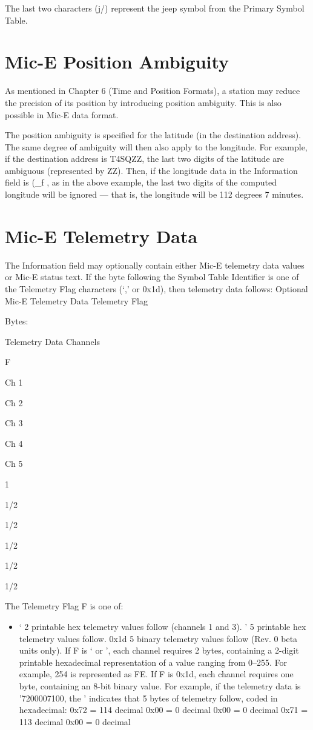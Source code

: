The last two characters (j/) represent the jeep symbol from the Primary
Symbol Table.



\section {Mic-E Position Ambiguity}

As mentioned in Chapter 6 (Time and Position Formats), a station may
reduce the precision of its position by introducing position ambiguity. This is
also possible in Mic-E data format.

The position ambiguity is specified for the latitude (in the destination
address). The same degree of ambiguity will then also apply to the longitude.
For example, if the destination address is T4SQZZ, the last two digits of the
latitude are ambiguous (represented by ZZ). Then, if the longitude data in the
Information field is (_f , as in the above example, the last two digits of the
computed longitude will be ignored — that is, the longitude will be 112
degrees 7 minutes.

\section {Mic-E Telemetry Data}

The Information field may optionally contain either Mic-E telemetry data
values or Mic-E status text.
If the byte following the Symbol Table Identifier is one of the Telemetry
Flag characters (‘,' or 0x1d), then telemetry data follows:
Optional Mic-E Telemetry Data
Telemetry
Flag

Bytes:

Telemetry Data Channels

F

Ch 1

Ch 2

Ch 3

Ch 4

Ch 5

1

1/2

1/2

1/2

1/2

1/2


The Telemetry Flag F is one of:

\begin{itemize}
  
\item ‘
2 printable hex telemetry values follow (channels 1 and 3).
'
5 printable hex telemetry values follow.
0x1d 5 binary telemetry values follow (Rev. 0 beta units only).
If F is ‘ or ', each channel requires 2 bytes, containing a 2-digit printable
hexadecimal representation of a value ranging from 0–255. For example, 254
is represented as FE.
If F is 0x1d, each channel requires one byte, containing an 8-bit binary value.
For example, if the telemetry data is '7200007100, the ' indicates that 5
bytes of telemetry follow, coded in hexadecimal:
0x72 = 114 decimal
0x00 = 0 decimal
0x00 = 0 decimal
0x71 = 113 decimal
0x00 = 0 decimal

\end {itemize}

